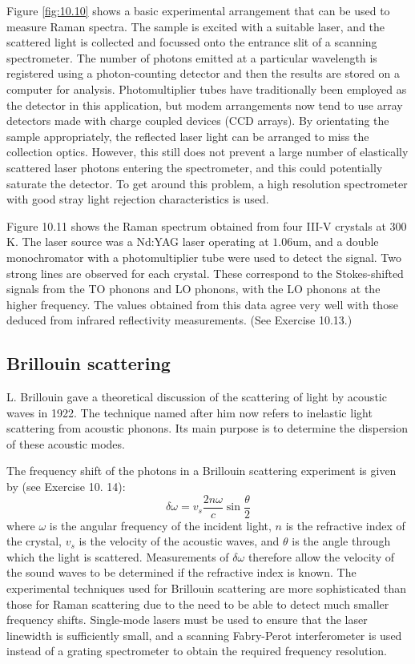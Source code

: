 \documentclass[12pt]{book}
\def\um{\mathrm{um}}
\begin{document}
{Figure \ref{fig:10.10} shows a basic experimental arrangement that can be used to measure Raman spectra. The sample is excited with a suitable laser, and the scattered light is collected and focussed onto the entrance slit of a scanning spectrometer. The number of photons emitted at a particular wavelength is registered using a photon-counting detector and then the results are stored on a computer for analysis. Photomultiplier tubes have traditionally been employed as the detector in this application, but modem arrangements now tend to use array detectors made with charge coupled devices (CCD arrays). By orientating the sample appropriately, the reflected laser light can be arranged to miss the collection optics. However, this still does not prevent a large number of elastically scattered laser photons entering the spectrometer, and this could potentially saturate the detector. To get around this problem, a high resolution spectrometer with good stray light rejection characteristics is used.

Figure 10.11 shows the Raman spectrum obtained from four III-V crystals at 300 K. The laser source was a Nd:YAG laser operating at $1.06\um$, and a double monochromator with a photomultiplier tube were used to detect the signal. Two strong lines are observed for each crystal. These correspond to the Stokes-shifted signals from the TO phonons and LO phonons, with the LO phonons at the higher frequency. The values obtained from this data agree very well with those deduced from infrared reflectivity measurements. (See Exercise 10.13.)

\subsection{Brillouin scattering}
L. Brillouin gave a theoretical discussion of the scattering of light by acoustic waves in 1922. The technique named after him now refers to inelastic light scattering from acoustic phonons. Its main purpose is to determine the dispersion of these acoustic modes.

The frequency shift of the photons in a Brillouin scattering experiment is given by (see Exercise 10. 14):
\begin{equation}\label{equa:10.33}
  \delta\omega=v_s\frac{2n\omega}{c}\sin{\frac{\theta}{2}}
\end{equation}
where $\omega$ is the angular frequency of the incident light, $n$ is the refractive index of the crystal, $v_s$ is the velocity of the acoustic waves, and $\theta$ is the angle through which the light is scattered. Measurements of $\delta\omega$ therefore allow the velocity of the sound waves to be determined if the refractive index is known. The experimental techniques used for Brillouin scattering are more sophisticated than those for Raman scattering due to the need to be able to detect much smaller frequency shifts. Single-mode lasers must be used to ensure that the laser linewidth is sufficiently small, and a scanning Fabry-Perot interferometer is used instead of a grating spectrometer to obtain the required frequency resolution.

}
\end{document}
